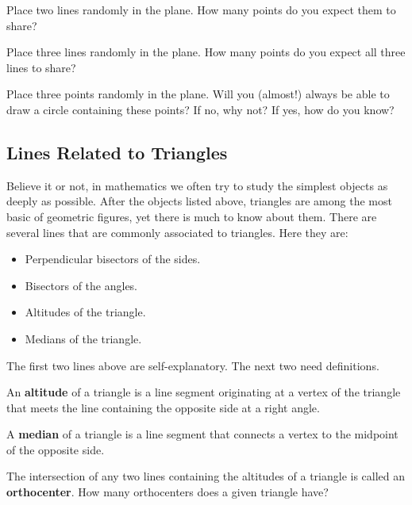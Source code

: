 \begin{question} 
Place two lines randomly in the plane. How many points do you expect
them to share?
\end{question}
\QM


\begin{question} 
Place three lines randomly in the plane. How many points do you expect
all three lines to share?
\end{question}
\QM


\begin{question} 
Place three points randomly in the plane. Will you (almost!) always be
able to draw a circle containing these points? If no, why not? If yes,
how do you know?
\end{question}
\QM




\subsection{Lines Related to Triangles}

Believe it or not, in mathematics we often try to study the simplest
objects as deeply as possible. After the objects listed above,
triangles are among the most basic of geometric figures, yet there is
much to know about them.  There are several lines that are commonly
associated to triangles. Here they are:
\begin{itemize}
\item Perpendicular bisectors of the sides.
\item Bisectors of the angles.
\item Altitudes of the triangle.
\item Medians of the triangle. 
\end{itemize}

The first two lines above are self-explanatory. The next two need definitions.

\begin{definition} 
An \textbf{altitude} of a triangle is a line segment originating at a
vertex of the triangle that meets the line containing the opposite
side at a right angle.
\end{definition}


\begin{definition} 
A \textbf{median} of a triangle is a line segment that connects a
vertex to the midpoint of the opposite side.
\end{definition}

\begin{question} 
The intersection of any two lines containing the altitudes of a
triangle is called an \textbf{orthocenter}. How
many orthocenters does a given triangle have?
\end{question}
\QM


